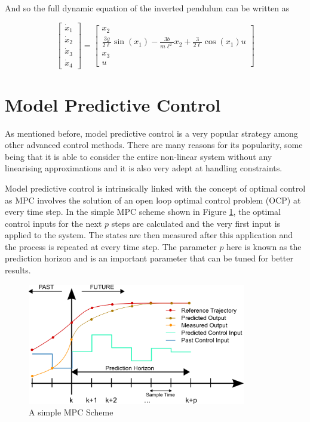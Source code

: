 And so the full dynamic equation of the inverted pendulum can be written as 

\begin{equation}
\begin{bmatrix}
\dot{x}_1 \\
\dot{x}_2 \\
\dot{x}_3 \\
\dot{x}_4
\end{bmatrix} = \begin{bmatrix}
x_2\\
\frac{3g}{2\ell} \sin(x_1)    -\frac{3b}{m\ell^2}x_2              + \frac{3}{2\ell} \cos(x_1)u \\
x_3 \\
u
\end{bmatrix}
\end{equation}



\section{Model Predictive Control}

As mentioned before, model predictive control is a very popular strategy among other advanced control methods. There are many reasons for its popularity, some being that it is able to consider the entire non-linear system without any linearising approximations and it is also very adept at handling constraints. 



Model predictive control is intrinsically linked with the concept of optimal control as MPC involves the solution of an open loop optimal control problem (OCP) at every time step. In the simple MPC scheme shown in Figure \ref{fig:MPC Schematic}, the optimal control inputs for the next $p$ steps are calculated and the very first input is applied to the system. The states are then measured after this application and the process is repeated at every time step. The parameter $p$ here is known as the prediction horizon and is an important parameter that can be tuned for better results. 

\begin{figure}[htbp]
	\centering
	\includegraphics[width=0.85\textwidth,scale=1]{"src/Images/mpc.png"}
	\caption{A simple MPC Scheme \cite{MPC2023}}
	\label{fig:MPC Schematic}
\end{figure}

